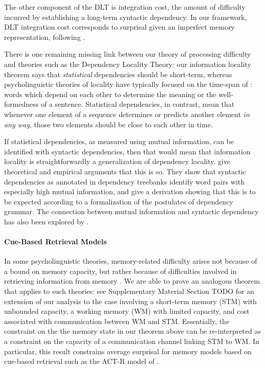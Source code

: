 The other component of the DLT is integration cost, the amount of difficulty incurred by establishing a long-term syntactic dependency. 
In our framework, DLT integration cost corresponds to surprisal given an imperfect memory representation, following \cite{futrell2020lossy}.

There is one remaining missing link between our theory of processing difficulty and theories such as the Dependency Locality Theory:
our information locality theorem says that \emph{statistical} dependencies should be short-term, whereas psycholinguistic theories of locality have typically focused on the time-span of : words which depend on each other to determine the meaning or the well-formedness of a sentence. Statistical dependencies, in contrast, mean that whenever one element of a sequence determines or predicts another element \emph{in any way}, those two elements should be close to each other in time. 

If statistical dependencies, as measured using mutual information, can be identified with syntactic dependencies, then that would mean that information locality is straightforwardly a generalization of dependency locality. \citet{futrell2019syntactic} give theoretical and empirical arguments that this is so. They show that syntactic dependencies as annotated in dependency treebanks identify word pairs with especially high mutual information, and give a derivation showing that this is to be expected according to a formalization of the postulates of dependency grammar. The connection between mutual information and syntactic dependency has also been explored by \citet{}. %


\paragraph{Cue-Based Retrieval Models}

In some psycholinguistic theories, memory-related difficulty arises not because of a bound on memory capacity, but rather because of difficulties involved in retrieving information from memory \citep{}. We are able to prove an analogous theorem that applies to such theories: see Supplementary Material Section TODO for an extension of our analysis to the case involving a short-term memory (STM) with unbounded capacity, a working memory (WM) with limited capacity, and cost associated with communication between WM and STM. Essentially, the constraint on the the memory state in our theorem above can be re-interpreted as a constraint on the capacity of a communication channel linking STM to WM. In particular, this result constrains average surprisal for memory models based on cue-based retrieval such as the ACT-R model of \citet{lewis-activation-based-2005}.

